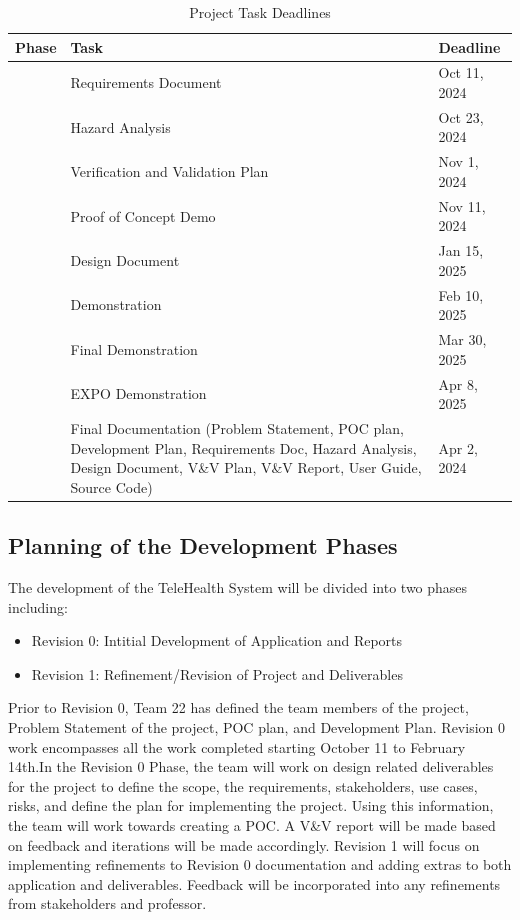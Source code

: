 \documentclass[12pt]{article}
\begin{document}
\begin{table}[h!]
  \caption{Project Task Deadlines}
  \centering
  \begin{tabular}{|>{\centering\arraybackslash}m{2.5cm}|>{\centering\arraybackslash}m{6cm}|>{\centering\arraybackslash}m{3cm}|}
  \hline
  \textbf{Phase} & \textbf{Task} & \textbf{Deadline} \\ 
  \hline
  \multirow{6}{*}{Revision 0} & Requirements Document & Oct 11, 2024 \\
  \cline{2-3}
   & Hazard Analysis & Oct 23, 2024 \\ 
  \cline{2-3}
   & Verification and Validation Plan & Nov 1, 2024 \\ 
  \cline{2-3}
   & Proof of Concept Demo & Nov 11, 2024 \\ 
  \cline{2-3}
   & Design Document & Jan 15, 2025 \\ 
  \cline{2-3}
   & Demonstration & Feb 10, 2025 \\ 
  \hline
  \multirow{3}{*}{Revision 1} & Final Demonstration & Mar 30, 2025 \\ 
  \cline{2-3}
   & EXPO Demonstration & Apr 8, 2025 \\ 
  \cline{2-3}
   & Final Documentation (Problem Statement, POC plan, Development Plan, Requirements Doc, Hazard Analysis, Design Document, V\&V Plan, V\&V Report, User Guide, Source Code) & Apr 2, 2024 \\ 
  \hline
  \end{tabular}
\end{table}

\subsection{Planning of the Development Phases}

\hspace{2em}The development of the TeleHealth System will be divided into two phases including:
\begin{itemize}
\item Revision 0: Intitial Development of Application and Reports
\item Revision 1: Refinement/Revision of Project and Deliverables
\end{itemize}
\hspace{2em}Prior to Revision 0, Team 22 has defined the team members of the project, Problem Statement of the project, POC plan, and Development Plan.
Revision 0 work encompasses all the work completed starting October 11 to February 14th.In the Revision 0 Phase, the team will work on design related deliverables for the project to define the scope, the requirements, stakeholders, use cases, risks, and define the plan for implementing the project. Using this information, the team will work towards creating a POC.
A V\&V report will be made based on feedback and iterations will be made accordingly. 
Revision 1 will focus on implementing refinements to Revision 0 documentation and adding extras to both application and deliverables. Feedback will be incorporated into any refinements from stakeholders and professor. \\
\end{document}
